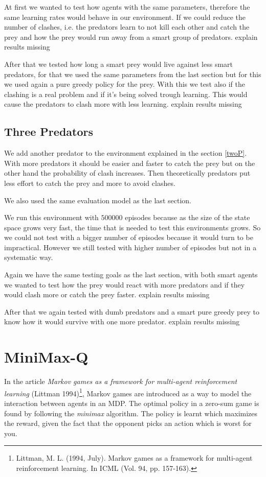 \documentclass{article}
\begin{document}
At first we wanted to test how agents with the same parameters, therefore
the same learning rates would behave in our environment. If we could reduce the
number of clashes, i.e. the predators learn to not kill each other and catch the
prey and how the prey would run away from a smart group of predators.
\error explain results missing

After that we tested how long a smart prey would live against less smart
predators, for that we used the same parameters from the last section but for
this we used again a pure greedy policy for the prey.
With this we test also if the clashing is a real problem and if it's being solved
trough learning. This would cause the predators to clash more with less
learning. 
\error explain results missing


\subsection{Three Predators}
We add another predator to the environment explained in the section \ref{twoP}.
With more predators it should be easier and faster to catch the prey but on the
other hand the probability of clash increases. Then theoretically predators put
less effort to catch the prey and more to avoid clashes.

We also used the same evaluation model as the last section.

We run this environment with $500000$ episodes because as the size of the state
space grows very fast, the time that is needed to test this environments grows.
So we could not test with a bigger number of episodes because it would turn to
be impractical. However we still tested with higher number of episodes but not
in a systematic way.

Again we have the same testing goals as the last section, with both smart agents
we wanted to test how the prey would react with more predators and if they would
clash more or catch the prey faster.
\error explain results missing

After that we again tested with dumb predators and a smart pure greedy prey to
know how it would survive with one more predator.
\error explain results missing


\section{MiniMax-Q}
In the article \emph{Markov games as a framework for multi-agent reinforcement learning} (Littman 1994)\footnote{Littman, M. L. (1994, July). Markov games as a framework for multi-agent reinforcement learning. In ICML (Vol. 94, pp. 157-163).}, Markov games are introduced as a way to model the interaction between agents in an MDP. The optimal policy in a zero-sum game is found by following the \emph{minimax} algorithm. The policy is learnt which maximizes the reward, given the fact that the opponent picks an action which is worst for you.
\end{document}
